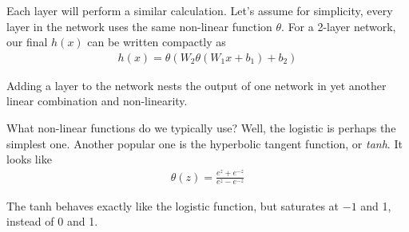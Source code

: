 \documentclass[a4paper,10pt]{article}
\begin{document}
Each layer will perform a similar
calculation. Let's assume
for simplicity, every layer in the network
uses the same non-linear function $\theta$.
For a 2-layer network,
our final $h(x)$ can be written compactly as
\begin{align*}
  h(x) = \theta(W_2\theta(W_1x + b_1) + b_2)
\end{align*}

Adding a layer to the network nests the output
of one network in yet another
linear combination and non-linearity.

What non-linear functions do we typically use?
Well, the logistic is perhaps the simplest one.
Another popular one is the hyperbolic tangent function,
or \emph{tanh}. It looks like
\begin{align*}
  \theta(z) = \frac{e^z + e^{-z}}{e^z - e^{-z}}
\end{align*}

The tanh behaves exactly like the logistic function,
but saturates at $-1$ and 1, instead of 0 and 1.


\end{document}
